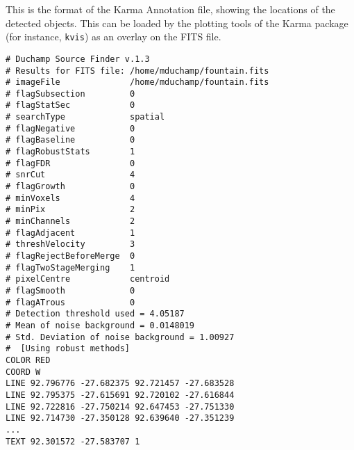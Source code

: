%
%
%
%
\label{app-karma}

This is the format of the Karma Annotation file, showing the locations
of the detected objects. This can be loaded by the plotting tools of
the Karma package (for instance, \texttt{kvis}) as an overlay on the FITS
file.

\begin{verbatim}
# Duchamp Source Finder v.1.3
# Results for FITS file: /home/mduchamp/fountain.fits
# imageFile              /home/mduchamp/fountain.fits
# flagSubsection         0
# flagStatSec            0
# searchType             spatial
# flagNegative           0
# flagBaseline           0
# flagRobustStats        1
# flagFDR                0
# snrCut                 4
# flagGrowth             0
# minVoxels              4
# minPix                 2
# minChannels            2
# flagAdjacent           1
# threshVelocity         3
# flagRejectBeforeMerge  0
# flagTwoStageMerging    1
# pixelCentre            centroid
# flagSmooth             0
# flagATrous             0
# Detection threshold used = 4.05187
# Mean of noise background = 0.0148019
# Std. Deviation of noise background = 1.00927
#  [Using robust methods]
COLOR RED
COORD W
LINE 92.796776 -27.682375 92.721457 -27.683528
LINE 92.795375 -27.615691 92.720102 -27.616844
LINE 92.722816 -27.750214 92.647453 -27.751330
LINE 92.714730 -27.350128 92.639640 -27.351239
...
TEXT 92.301572 -27.583707 1
\end{verbatim}

